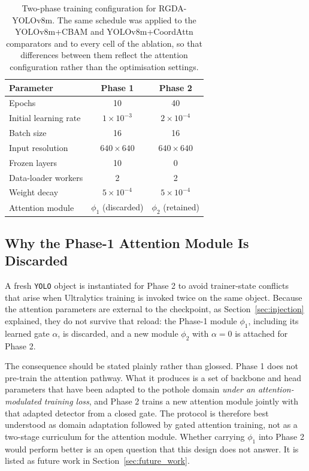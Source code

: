 \documentclass[MScCS]{uccthesis}
\begin{document}
\begin{table}[tbp]
\centering
\small
\begin{tabular}{@{}lcc@{}}
\toprule
\textbf{Parameter} & \textbf{Phase 1} & \textbf{Phase 2} \\
\midrule
Epochs                & 10 & 40 \\
Initial learning rate & $1 \times 10^{-3}$ & $2 \times 10^{-4}$ \\
Batch size            & 16 & 16 \\
Input resolution      & $640 \times 640$ & $640 \times 640$ \\
Frozen layers         & 10 & 0 \\
Data-loader workers   & 2 & 2 \\
Weight decay          & $5 \times 10^{-4}$ & $5 \times 10^{-4}$ \\
Attention module      & $\phi_1$ (discarded) & $\phi_2$ (retained) \\
\bottomrule
\end{tabular}
\caption[Two-phase training configuration.]
        {\label{tab:training}Two-phase training configuration for
         RGDA-YOLOv8m. The same schedule was applied to the YOLOv8m+CBAM and
         YOLOv8m+CoordAttn comparators and to every cell of the ablation, so
         that differences between them reflect the attention configuration
         rather than the optimisation settings.}
\end{table}

\subsection{Why the Phase-1 Attention Module Is Discarded}

A fresh \texttt{YOLO} object is instantiated for Phase 2 to avoid trainer-state
conflicts that arise when Ultralytics training is invoked twice on the same
object. Because the attention parameters are external to the checkpoint, as
Section~\ref{sec:injection} explained, they do not survive that reload: the
Phase-1 module $\phi_1$, including its learned gate $\alpha$, is discarded, and
a new module $\phi_2$ with $\alpha = 0$ is attached for Phase 2.

The consequence should be stated plainly rather than glossed. Phase 1 does not
pre-train the attention pathway. What it produces is a set of backbone and head
parameters that have been adapted to the pothole domain \emph{under an
attention-modulated training loss}, and Phase 2 trains a new attention module
jointly with that adapted detector from a closed gate. The protocol is
therefore best understood as domain adaptation followed by gated attention
training, not as a two-stage curriculum for the attention module. Whether
carrying $\phi_1$ into Phase 2 would perform better is an open question that
this design does not answer. It is listed as future work in
Section~\ref{sec:future_work}.
\end{document}
